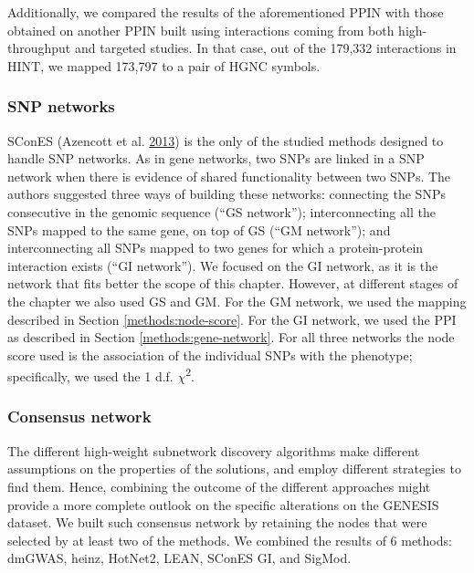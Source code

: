 \documentclass[
  11pt,
]{env/yjiao}
\begin{document}
Additionally, we compared the results of the aforementioned PPIN with
those obtained on another PPIN built using interactions coming from both
high-throughput and targeted studies. In that case, out of the 179,332
interactions in HINT, we mapped 173,797 to a pair of HGNC symbols.

\hypertarget{methods:snp-network}{%
\subsubsection{SNP networks}\label{methods:snp-network}}

SConES (Azencott et al. \protect\hyperlink{ref-azencott_efficient_2013}{2013}) is the only of the studied methods
designed to handle SNP networks. As in gene networks, two SNPs are
linked in a SNP network when there is evidence of shared functionality
between two SNPs. The authors suggested three ways of building these
networks: connecting the SNPs consecutive in the genomic sequence (``GS
network''); interconnecting all the SNPs mapped to the same gene, on top
of GS (``GM network''); and interconnecting all SNPs mapped to two genes
for which a protein-protein interaction exists (``GI network''). We
focused on the GI network, as it is the network that fits better the
scope of this chapter. However, at different stages of the chapter we
also used GS and GM. For the GM network, we used the mapping described
in Section \ref{methods:node-score}. For the GI network, we used the PPI as
described in Section \ref{methods:gene-network}. For all three networks the
node score used is the association of the individual SNPs with the phenotype;
specifically, we used the 1 d.f. \(\chi\)\textsuperscript{2}.

\hypertarget{methods:consensus}{%
\subsubsection{Consensus network}\label{methods:consensus}}

The different high-weight subnetwork discovery algorithms make different
assumptions on the properties of the solutions, and employ different
strategies to find them. Hence, combining the outcome of the different
approaches might provide a more complete outlook on the specific
alterations on the GENESIS dataset. We built such consensus network by
retaining the nodes that were selected by at least two of the methods.
We combined the results of 6 methods: dmGWAS, heinz, HotNet2, LEAN,
SConES GI, and SigMod.
\end{document}
